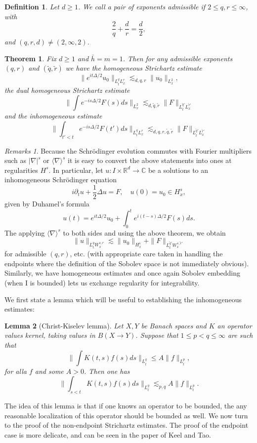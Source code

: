 \documentclass[11pt]{article}
\newtheorem{thm}{Theorem}
\newtheorem{lem}[thm]{Lemma}
\newtheorem*{defn}{Definition}
\theoremstyle{remark}
\newtheorem*{rmks}{Remarks}
\newcommand{\1}{\textbf{1}}
\newcommand{\lle}{\lesssim}
\def\norm#1{\| #1  \|}
\def\brac#1{\langle #1  \rangle}
\newcommand{\bbR}{\mathbb{R}}
\newcommand{\bbC}{\mathbb{C}}
\begin{document}
\begin{defn}
Let $d \geq 1$. We call a pair of exponents admissible if $2 \leq q,r\leq \infty$, with
\[
\frac{2}{q} + \frac{d}{r} = \frac{d}{2},
\]
and $(q,r,d) \neq (2, \infty,2)$.
\end{defn}
\begin{thm}
Fix $d \geq 1$ and $\bar h = m = 1$. Then for any admissible exponents $(q,r)$ and $(\tilde{q},\tilde{r})$ we have the homogeneous Strichartz estimate
\[
\norm{e^{it\Delta/2} u_0}_{L^q_t L^r_x} \lle_{d,q,r} \norm{u_0}_{L^2_x},
\]
the dual homogeneous Strichartz estimate
\[
\norm{\int e^{-is\Delta/2} F(s)ds }_{L^2_x} \lle_{d,\tilde{q},\tilde{r}} \norm{F}_{L_t^{\tilde{q}'}L_x^{\tilde{r}'}}
\]
and the inhomogeneous estimate
\[
\norm{\int_{t'<t} e^{-is\Delta/2} F(t') ds}_{L^q_t L^r_x} \lle_{d,q,r,\tilde{q},\tilde{r}} \norm{F}_{L_t^{\tilde{q}'}L_x^{\tilde{r}'}}
\]
\end{thm}
\begin{rmks}
Because the Schr\"odinger evolution commutes with Fourier multipliers such as $|\nabla|^s$ or $\brac{\nabla}^s$ it is easy to convert the above statements into ones at regularities $H^s$. In particular, let $u : I \times \bbR^d \to \bbC$ be a solutions to an inhomogeneous Schr\"odinger equation
\[
i \partial_t u + \frac{1}{2} \Delta u = F, \quad u(0) = u_0 \in H^s_x,
\]
given by Duhamel's formula
\[
u(t) = e^{it \Delta/2} u_0 + \int_0^t e^{i(t-s)\Delta/2} F(s) ds.
\]
The applying $\brac{\nabla}^s$ to both sides and using the above theorem, we obtain
\[
\norm{u}_{L^q_t W^{s,r}_x} \lle \norm{u_0}_{H^s_x} + \norm{F}_{L^{\tilde{q}'}_t W^{s,\tilde{r}'}_x}
\]
for admissible $(q,r)$, etc. (with appropriate care taken in handling the endpoints where the definition of the Sobolev space is not immediately obvious). Similarly, we have homogeneous estimates and once again Sobolev embedding (when I is bounded) lets us exchange regularity for integrability.
\end{rmks}
We first state a lemma which will be useful to establishing the inhomogeneous estimates:
\begin{lem}[Christ-Kiselev lemma]
Let $X,Y$ be Banach spaces and $K$ an operator values kernel, taking values in $B(X \to Y)$. Suppose that $1 \leq p < q \leq \infty$ are such that
\[
\norm{\int K(t,s) f(s)ds}_{L_t^q} \leq A \norm{f}_{L^p_t},
\]
for alla $f$ and some $A > 0$. Then one has
\[
\norm{\int_{s <t}K(t,s) f(s) ds}_{L_t^q} \lle_{p,q} A \norm{f}_{L^p_t}.
\]
\end{lem}
The idea of this lemma is that if one knows an operator to be bounded, the any reasonable localization of this operator should be bounded as well. We now turn to the proof of the non-endpoint Strichartz estimates. The proof of the endpoint case is more delicate, and can be seen in the paper of Keel and Tao.
\end{document}
